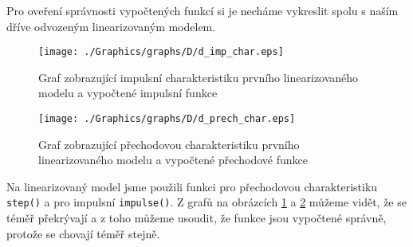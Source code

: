\documentclass{article}
\begin{document}
			Pro oveření správnosti vypočtených funkcí si je necháme vykreslit spolu s naším dříve odvozeným linearizovaným modelem.
			\begin{figure}[H]
				\centering
				\texttt{[image: ./Graphics/graphs/D/d\_imp\_char.eps]}
				\caption{Graf zobrazující impulsní charakteristiku prvního linearizovaného modelu a vypočtené impulsní funkce}
				\label{graph:d_impulsni_char}			
			\end{figure}
			\begin{figure}[H]
				\centering
				\texttt{[image: ./Graphics/graphs/D/d\_prech\_char.eps]}
				\caption{Graf zobrazující přechodovou charakteristiku prvního linearizovaného modelu a vypočtené přechodové funkce}
				\label{graph:d_prechodova_char}
			\end{figure}
			Na linearizovaný model jsme použili funkci pro přechodovou charakteristiku \verb|step()| a pro impulsní \verb|impulse()|. Z grafů na obrázcích \ref{graph:d_impulsni_char} a \ref{graph:d_prechodova_char} můžeme vidět, že se téměř překrývají a z toho můžeme usoudit, že funkce jsou vypočtené správně, protože se chovají téměř stejně.
\end{document}
